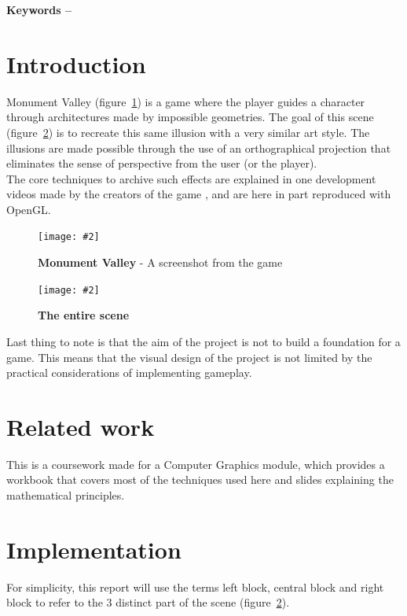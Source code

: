 \documentclass[10pt, a4paper]{article}
\title{\mytitle}
\author{\myauthor\hspace{1em}\\\contact\\Edinburgh Napier University\hspace{0.5em}-\hspace{0.5em}\mymodule}
\date{}
\newcommand{\figuremacro}[5]{
    \begin{figure}[#1]
        \centering
        \texttt{[image: \#2]}
        \caption[#3]{\textbf{#3}#4}
        \label{fig:#2}
    \end{figure}
}
\begin{document}
	\maketitle
	\begin{abstract}
		This computer graphics project aims to show a scene that replicates the art style used in the game \textit{Monument Valley} by using OpenGL. The main characteristic of the game -- and this project -- is the clever use of the clever use of a camera with an orthographical projection that allows to create impossible geometries.
	\end{abstract}
    
	\textbf{Keywords -- }{\mykeywords}
	\section{Introduction}
	Monument Valley (figure~\ref{fig:MV1}) is a game where the player guides a character through architectures made by impossible geometries. The goal of this scene (figure~\ref{fig:Capture01}) is to recreate this same illusion with a very similar art style. The illusions are made possible through the use of an orthographical projection that eliminates the sense of perspective from the user (or the player). \\ The core techniques to archive such effects are explained in one development videos made by the creators of the game \cite{Video1}, and are here in part reproduced with OpenGL.	\\
	\figuremacro{h}{MV1}{Monument Valley}{ - A screenshot from the game}{1.0}	
	\figuremacro{h}{Capture01}{The entire scene}{}{1.0}
	Last thing to note is that the aim of the project is not to build a foundation for a game. This means that the visual design of the project is not limited by the practical considerations of implementing gameplay.
	
	\section{Related work}
	This is a coursework made for a Computer Graphics module, which provides a workbook that covers most of the techniques used here and slides explaining the mathematical principles.
    
\section{Implementation}
	
For simplicity, this report will use the terms left block, central block and right block to refer to the 3 distinct part of the scene (figure~\ref{fig:Capture01}).
	
\end{document}
